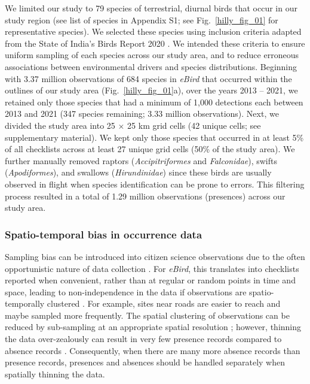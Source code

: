We limited our study to 79 species of terrestrial, diurnal birds that occur in our study region (see list of species in {\color{red}Appendix S1}; see Fig.~\ref{hilly_fig_01} for representative species).
We selected these species using inclusion criteria adapted from the State of India's Birds Report 2020 \citep[SoIB][]{viswanathan2020}.
We intended these criteria to ensure uniform sampling of each species across our study area, and to reduce erroneous associations between environmental drivers and species distributions.
Beginning with 3.37 million observations of 684 species in \textit{eBird} that occurred within the outlines of our study area (Fig.~\ref{hilly_fig_01}a), over the years 2013 -- 2021, we retained only those species that had a minimum of 1,000 detections each between 2013 and 2021 (347 species remaining; 3.33 million observations).
Next, we divided the study area into 25 $\times$ 25 km grid cells (42 unique cells; see supplementary material).
We kept only those species that occurred in at least 5\% of all checklists across at least 27 unique grid cells (50\% of the study area).
We further manually removed raptors (\textit{Accipitriformes} and \textit{Falconidae}), swifts (\textit{Apodiformes}), and swallows (\textit{Hirundinidae}) since these birds are usually observed in flight when species identification can be prone to errors.
This filtering process resulted in a total of 1.29 million observations (presences) across our study area.

\subsubsection*{Spatio-temporal bias in occurrence data}

Sampling bias can be introduced into citizen science observations due to the often opportunistic nature of data collection \citep{sullivan2014}.
For \textit{eBird}, this translates into checklists reported when convenient, rather than at regular or random points in time and space, leading to non-independence in the data if observations are spatio-temporally clustered \citep{johnston2021}.
For example, sites near roads are easier to reach and maybe sampled more frequently.
The spatial clustering of observations can be reduced by sub-sampling at an appropriate spatial resolution \citep{aiello-lammens2015}; however, thinning the data over-zealously can result in very few presence records compared to absence records \citep[i.e., class imbalance][]{steen2019}.
Consequently, when there are many more absence records than presence records, presences and absences should be handled separately when spatially thinning the data.

